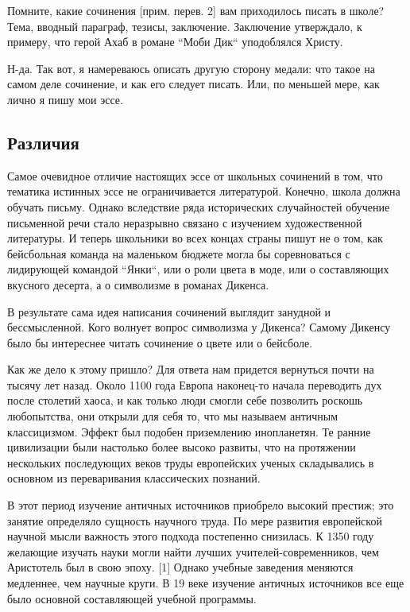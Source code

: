 \documentclass[ebook,12pt,oneside,openany]{memoir}
\begin{document}
\maketitle

Помните, какие сочинения [прим. перев. 2] вам приходилось писать в
школе? Тема, вводный параграф, тезисы, заключение. Заключение
утверждало, к примеру, что герой Ахаб в романе ``Моби Дик``
уподоблялся Христу. \newline

Н-да. Так вот, я намереваюсь описать другую сторону медали: что такое
на самом деле сочинение, и как его следует писать. Или, по меньшей
мере, как лично я пишу мои эссе. \newline

\subsection{Различия}

Самое очевидное отличие настоящих эссе от школьных сочинений в том,
что тематика истинных эссе не ограничивается литературой. Конечно,
школа должна обучать письму. Однако вследствие ряда исторических
случайностей обучение письменной речи стало неразрывно связано с
изучением художественной литературы. И теперь школьники во всех концах
страны пишут не о том, как бейсбольная команда на маленьком бюджете
могла бы соревноваться с лидирующей командой ``Янки``, или о роли
цвета в моде, или о составляющих вкусного десерта, а о символизме в
романах Дикенса. \newline

В результате сама идея написания сочинений выглядит занудной и
бессмысленной. Кого волнует вопрос символизма у Дикенса? Самому
Дикенсу было бы интереснее читать сочинение о цвете или о бейсболе.
\newline

Как же дело к этому пришло? Для ответа нам придется вернуться почти на
тысячу лет назад. Около 1100 года Европа наконец-то начала переводить
дух после столетий хаоса, и как только люди смогли себе позволить
роскошь любопытства, они открыли для себя то, что мы называем античным
классицизмом. Эффект был подобен приземлению инопланетян. Те ранние
цивилизации были настолько более высоко развиты, что на протяжении
нескольких последующих веков труды европейских ученых складывались в
основном из переваривания классических познаний. \newline

В этот период изучение античных источников приобрело высокий престиж;
это занятие определяло сущность научного труда. По мере развития
европейской научной мысли важность этого подхода постепенно снизилась.
К 1350 году желающие изучать науки могли найти лучших
учителей-современников, чем Аристотель был в свою эпоху. [1] Однако
учебные заведения меняются медленнее, чем научные круги. В 19 веке
изучение античных источников все еще было основной составляющей
учебной программы. \newline
\end{document}
